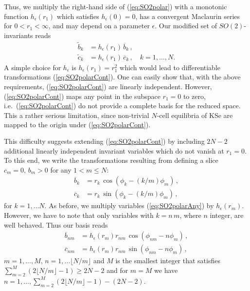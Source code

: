 \documentclass[aip,cha,showpacs,reprint]{revtex4-1} %
\newcommand{\bseq}{\begin{subequations}}
\newcommand{\eseq}{\end{subequations}}
\newcommand{\refeq}  [1] {(\ref{#1})}
\newcommand{\ie}{{i.e.}}
\begin{document}
Thus, we multiply the right-hand side of \refeq{eq:SO2polar} with a monotonic function
$h_\epsilon(r_1)$ which satisfies $h_\epsilon(0)=0$,
has a convergent Maclaurin series for $0<r_1<\infty$,
and may depend on a parameter $\epsilon$.
Our modified set of $SO(2)$-invariants reads
\bseq\label{eq:SO2polarCont}
  \begin{align}
    \tilde{b}_k &=
		    h_\epsilon(r_1)\,\overline{b}_k\,, \label{eq:SO2polarCont1}\\
    \tilde{c}_k &=
		    h_\epsilon(r_1)\,\overline{c}_k\,, \quad k=1,\ldots,N.\label{eq:SO2polarCont2}
  \end{align}
\eseq
A simple choice for $h_\epsilon$ is
$h_\epsilon(r_1)=r_1^2$ which would lead to differentiable transformations \refeq{eq:SO2polarCont}.
One can easily show that, with the above requirements,
\refeq{eq:SO2polarCont} are linearly independent. However,
\refeq{eq:SO2polarCont} maps any point in the subspace $r_1=0$ to zero, \ie\
\refeq{eq:SO2polarCont} do not provide a complete basis for the reduced space.
This a rather serious limitation, since non-trivial $N$-cell equilibria of
KSe are mapped to the origin under \refeq{eq:SO2polarCont}.

This difficulty suggests extending \refeq{eq:SO2polarCont} by including $2N-2$ additional linearly
independent invariant variables which do not vanish at $r_1=0$. To this end, we write
the transformations resulting from defining a slice $c_m=0,\, b_m>0$ for any $1<m\leq N$:
\bseq\label{eq:SO2polarAny}
  \begin{align}
    \overline{b}_k &=
		    r_k\, \cos\left(\phi_k-\left(k/m\right)\phi_m\right)\,, \label{eq:SO2polarAny1}\\
    \overline{c}_k &=
		    r_k\, \sin\left(\phi_k-\left(k/m\right)\phi_m\right)\,,\label{eq:SO2polarAny2}
  \end{align}
\eseq
for $k=1,\ldots N$. As before, we multiply variables \refeq{eq:SO2polarAny} by $h_\epsilon(r_m)$.
However, we have to note that only variables with $k=n\,m$, where $n$ integer, are well behaved.
Thus our basis reads
\bseq\label{eq:SO2polarExt}
\begin{align}
  \overline{b}_{nm} &=
		  h_\epsilon(r_m)r_{nm}\, \cos\left(\phi_{nm}-n\phi_m\right)\,, \label{eq:SO2polarAny1}\\
  \overline{c}_{nm} &=
		  h_\epsilon(r_m)r_{nm}\, \sin\left(\phi_{nm}-n\phi_m\right)\,,\label{eq:SO2polarAny2}
\end{align}
\eseq
$m=1,...,M$, $n=1,\ldots\lfloor N/m\rfloor$ and $M$ is the smallest integer that
satisfies $\sum_{m=2}^M(2\lfloor N/m\rfloor-1)\geq2N-2$ and for
$m=M$ we have $n=1,\ldots,\sum_{m=2}^M(2\lfloor N/m\rfloor-1)-(2N-2)$.
\end{document}
